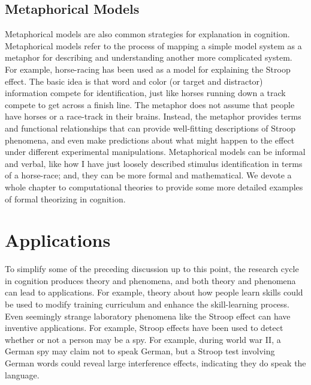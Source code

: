 \documentclass[
  oneside,
  12pt]{crumpbook}
\begin{document}
\hypertarget{metaphorical-models}{%
\subsection{Metaphorical Models}\label{metaphorical-models}}

Metaphorical models are also common strategies for explanation in cognition. Metaphorical models refer to the process of mapping a simple model system as a metaphor for describing and understanding another more complicated system. For example, horse-racing has been used as a model for explaining the Stroop effect. The basic idea is that word and color (or target and distractor) information compete for identification, just like horses running down a track compete to get across a finish line. The metaphor does not assume that people have horses or a race-track in their brains. Instead, the metaphor provides terms and functional relationships that can provide well-fitting descriptions of Stroop phenomena, and even make predictions about what might happen to the effect under different experimental manipulations. Metaphorical models can be informal and verbal, like how I have just loosely described stimulus identification in terms of a horse-race; and, they can be more formal and mathematical. We devote a whole chapter to computational theories to provide some more detailed examples of formal theorizing in cognition.

\hypertarget{applications}{%
\section{Applications}\label{applications}}

To simplify some of the preceding discussion up to this point, the research cycle in cognition produces theory and phenomena, and both theory and phenomena can lead to applications. For example, theory about how people learn skills could be used to modify training curriculum and enhance the skill-learning process. Even seemingly strange laboratory phenomena like the Stroop effect can have inventive applications. For example, Stroop effects have been used to detect whether or not a person may be a spy. For example, during world war II, a German spy may claim not to speak German, but a Stroop test involving German words could reveal large interference effects, indicating they do speak the language.
\end{document}
